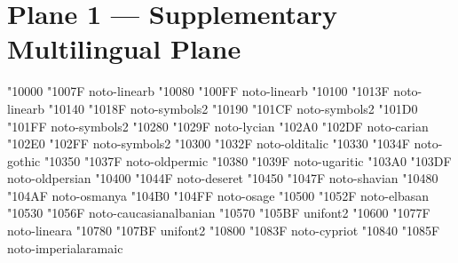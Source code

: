\documentclass{article}
\begin{document}
\section{Plane 1 --- Supplementary Multilingual Plane}

                                 { "10000} { "1007F} {noto-linearb}
                                 { "10080} { "100FF} {noto-linearb}
                                     { "10100} { "1013F} {noto-linearb}
                              { "10140} { "1018F} {noto-symbols2}
                                    { "10190} { "101CF} {noto-symbols2}
                                      { "101D0} { "101FF} {noto-symbols2}
                                             { "10280} { "1029F} {noto-lycian}
                                             { "102A0} { "102DF} {noto-carian}
                               { "102E0} { "102FF} {noto-symbols2}
                                         { "10300} { "1032F} {noto-olditalic}
                                             { "10330} { "1034F} {noto-gothic}
                                         { "10350} { "1037F} {noto-oldpermic}
                                           { "10380} { "1039F} {noto-ugaritic}
                                        { "103A0} { "103DF} {noto-oldpersian}
                                            { "10400} { "1044F} {noto-deseret}
                                            { "10450} { "1047F} {noto-shavian}
                                            { "10480} { "104AF} {noto-osmanya}
                                              { "104B0} { "104FF} {noto-osage}
                                            { "10500} { "1052F} {noto-elbasan}
                                 { "10530} { "1056F} {noto-caucasianalbanian}
                                           { "10570} { "105BF} {unifont2}
                                           { "10600} { "1077F} {noto-lineara}
                                   { "10780} { "107BF} {unifont2}
                                  { "10800} { "1083F} {noto-cypriot}
                                   { "10840} { "1085F} {noto-imperialaramaic}
\end{document}
